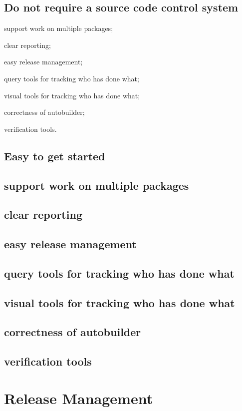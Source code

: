 \documentclass[12pt]{article}
\begin{document}
\begin{description}
\subsection{Do not require a source code control system}
\item support work on multiple packages;
\item clear reporting;
\item easy release management;
\item query tools for tracking who has done what;
\item visual tools for tracking who has done what;
\item correctness of autobuilder;
\item verification tools.
\end{description}

\subsection{Easy to get started}


\subsection{support work on multiple packages}
\subsection{clear reporting}
\subsection{easy release management}
\subsection{query tools for tracking who has done what}
\subsection{visual tools for tracking who has done what}
\subsection{correctness of autobuilder}
\subsection{verification tools}


\section{Release Management}
\end{document}
